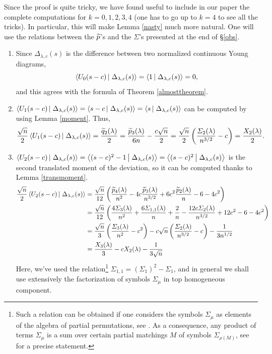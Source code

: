 \documentclass[10pt]{amsart}
\begin{document}
\begin{examples}
Since the proof is quite tricky, we have found useful to include in our paper the complete computations for $k=0,1,2,3,4$ (one has to go up to $k=4$ to see all the tricks). In particular, this will make Lemma \ref{nasty} much more natural. One will use the relations between the $\widetilde{p}$'s and the $\varSigma$'s presented at the end of \S\ref{obs}.
\begin{enumerate}
\item[$k=0$.] Since $\Delta_{\lambda,c}(s)$ is the difference between two normalized continuous Young diagrams, $$\scal{U_{0}(s-c)}{\Delta_{\lambda,c}(s)}=\scal{1}{\Delta_{\lambda,c}(s)}=0,$$
and this agrees with the formula of Theorem \ref{almosttheorem}.\vspace{2mm}
\item[$k=1$.] $\scal{U_{1}(s-c)}{\Delta_{\lambda,c}(s)}=\scal{s-c}{\Delta_{\lambda,c}(s)}=\scal{s}{\Delta_{\lambda,c}(s)}$ can be computed by using Lemma \ref{moment}. Thus,
$$\frac{\sqrt{n}}{2}\scal{U_{1}(s-c)}{\Delta_{\lambda,c}(s)}=\frac{\widetilde{q}_{2}(\lambda)}{2}=\frac{\widetilde{p}_{3}(\lambda)}{6n}-\frac{c\sqrt{n} }{2}=\frac{\sqrt{n}}{2}\left(\frac{\varSigma_{2}(\lambda)}{n^{3/2}}-c\right)=\frac{X_{2}(\lambda)}{2}.$$
\item[$k=2$.] $\scal{U_{2}(s-c)}{\Delta_{\lambda,c}(s)}=\scal{(s-c)^{2}-1}{\Delta_{\lambda,c}(s)}=\scal{(s-c)^{2}}{\Delta_{\lambda,c}(s)}$ is the second translated moment of the deviation, so it can be computed thanks to Lemma \ref{transmoment}. 
\begin{align*}
\frac{\sqrt{n}}{2}\scal{U_{2}(s-c)}{\Delta_{\lambda,c}(s)}&=\frac{\sqrt{n}}{12}\left(\frac{\tilp_{4}(\lambda)}{n^{2}}-4c\frac{\tilp_{3}(\lambda)}{n^{3/2}}+6c^{2}\frac{\tilp_{2}(\lambda)}{n}-6-4c^{2}\right)\\
&=\frac{\sqrt{n}}{12}\left(\frac{4\varSigma_{3}(\lambda)}{n^{2}}+\frac{6\varSigma_{1,1}(\lambda)}{n}+\frac{2}{n}-\frac{12c\varSigma_{2}(\lambda)}{n^{3/2}}+12c^{2}-6-4c^{2}\right)\\
&=\frac{\sqrt{n}}{3}\left(\frac{\varSigma_{3}(\lambda)}{n^{2}}-c^{2}\right)-c\sqrt{n}\left(\frac{\varSigma_{2}(\lambda)}{n^{3/2}}-c\right)-\frac{1}{3n^{1/2}}\\
&=\frac{X_{3}(\lambda)}{3}-cX_{2}(\lambda)-\frac{1}{3\sqrt{n}}
\end{align*}
Here, we've used the relation\footnote{Such a relation can be obtained if one considers the symbols $\varSigma_{\mu}$ as elements of the algebra of partial permutations, see \cite{IK99}. As a consequence, any product of terms $\varSigma_{\mu}$ is a sum over certain partial matchings $M$ of symbols $\varSigma_{\rho(M)}$, see \cite[\S3.3]{FM10} for a precise statement.} $\varSigma_{1,1}=(\varSigma_{1})^{2}-\varSigma_{1}$, and in general we shall use extensively the factorization of symbols $\varSigma_{\mu}$ in top homogeneous component.\vspace{2mm}

\end{enumerate}
\end{examples}
\end{document}
